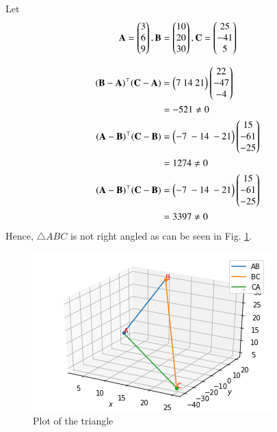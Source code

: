 Let
\begin{align}
   \mathbf{A} = \begin{pmatrix}3\\6\\9\end{pmatrix} , \mathbf{B} = \begin{pmatrix}10\\20\\30\end{pmatrix}, \mathbf{C} = \begin{pmatrix}25\\-41\\5\end{pmatrix} 
\end{align}

\begin{align}
     (\vec{B}-\vec{A})^\top(\vec{C}-\vec{A})&=\myvec{7\ 14\ 21}\myvec{22\\-47\\-4}
     \\
& = -521 \ne 0
\\
     (\vec{A}-\vec{B})^\top(\vec{C}-\vec{B})&=\myvec{-7\ -14\ -21}\myvec{15\\-61\\-25}
\\
&= 1274 \ne 0
\\
(\vec{A}-\vec{B})^\top(\vec{C}-\vec{B})&=\myvec{-7\ -14\ -21}\myvec{15\\-61\\-25}
\\
&= 3397 \ne 0 
\end{align}
Hence, $\triangle ABC$ is not right angled as can be seen in Fig.          \ref{vectors/july/2/6/Figure}.
%
\begin{figure}[!h]
         \centering
         \includegraphics[width=\columnwidth]{solutions/july/2/6/Figures/Figure.png}
         \caption{Plot of the triangle}
         \label{vectors/july/2/6/Figure}
\end{figure}
